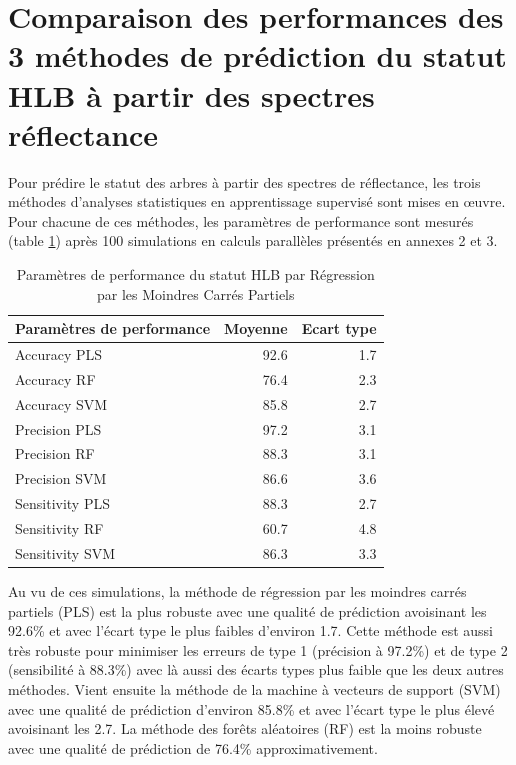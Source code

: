 \documentclass[
  11pt,
  french,
  a4paper,
  extrafontsizes,onecolumn,openright
  ]{memoir}
\begin{document}
\vfill
\newpage

\hypertarget{comparaison-des-performances-des-3-muxe9thodes-de-pruxe9diction-du-statut-hlb-uxe0-partir-des-spectres-ruxe9flectance}{%
\section{Comparaison des performances des 3 méthodes de prédiction du statut HLB à partir des spectres réflectance}\label{comparaison-des-performances-des-3-muxe9thodes-de-pruxe9diction-du-statut-hlb-uxe0-partir-des-spectres-ruxe9flectance}}

Pour prédire le statut des arbres à partir des spectres de réflectance, les trois méthodes d'analyses statistiques en apprentissage supervisé sont mises en œuvre. Pour chacune de ces méthodes, les paramètres de performance sont mesurés (table \ref{tab:T2}) après 100 simulations en calculs parallèles présentés en annexes 2 et 3.

\scriptsize

\begin{longtable}[t]{lrr}
\caption{\label{tab:T2}Paramètres de performance du statut HLB par Régression par les Moindres Carrés Partiels}\\
\toprule
Paramètres de performance & Moyenne & Ecart type\\
\midrule
Accuracy PLS & 92.6 & 1.7\\
Accuracy RF & 76.4 & 2.3\\
Accuracy SVM & 85.8 & 2.7\\
Precision PLS & 97.2 & 3.1\\
Precision RF & 88.3 & 3.1\\
\addlinespace
Precision SVM & 86.6 & 3.6\\
Sensitivity PLS & 88.3 & 2.7\\
Sensitivity RF & 60.7 & 4.8\\
Sensitivity SVM & 86.3 & 3.3\\
\bottomrule
\end{longtable}

\normalsize

Au vu de ces simulations, la méthode de régression par les moindres carrés partiels (PLS) est la plus robuste avec une qualité de prédiction avoisinant les 92.6\% et avec l'écart type le plus faibles d'environ 1.7.
Cette méthode est aussi très robuste pour minimiser les erreurs de type 1 (précision à 97.2\%) et de type 2 (sensibilité à 88.3\%) avec là aussi des écarts types plus faible que les deux autres méthodes.
Vient ensuite la méthode de la machine à vecteurs de support (SVM) avec une qualité de prédiction d'environ 85.8\% et avec l'écart type le plus élevé avoisinant les 2.7. La méthode des forêts aléatoires (RF) est la moins robuste avec une qualité de prédiction de 76.4\% approximativement.
\end{document}
